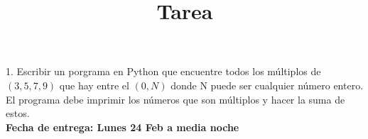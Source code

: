\documentclass[12pt]{article}
\title{Tarea}
\begin{document}
\maketitle

1. Escribir un porgrama en Python que encuentre todos los m\'ultiplos de $(3, 5, 7, 9)$ que hay entre el $(0, N)$ donde N puede ser cualquier n\'umero entero. El programa debe imprimir los n\'umeros que son m\'ultiplos y hacer la suma de estos. \\

\textbf{Fecha de entrega: Lunes 24 Feb a media noche}
\end{document}
